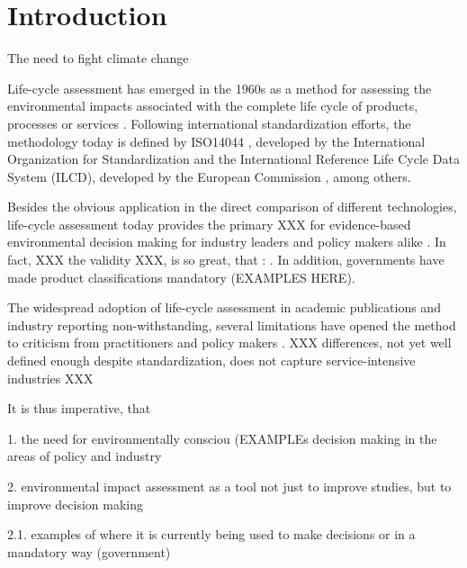 \documentclass{article}
\begin{document}
\section{Introduction}

    The need to fight climate change \cite{rama_climate_2022}

    Life-cycle assessment has emerged in the 1960s as a method for assessing the environmental impacts associated with the complete life cycle of products, processes or services \cite{hauschild_life_2018}. Following international standardization efforts, the methodology today is defined by ISO14044 \cite{noauthor_iso_2006}, developed by the International Organization for Standardization and the International Reference Life Cycle Data System (ILCD), developed by the European Commission \cite{european_commission_joint_research_centre_institute_for_environment_and_sustainability_ildc_2010}, among others. 
    
    Besides the obvious application in the direct comparison of different technologies, life-cycle assessment today provides the primary XXX for evidence-based environmental decision making for industry leaders and policy makers alike \cite{seidel_application_2016}. In fact, XXX the validity XXX, is so great, that : \cite{tillman_significance_2000}\cite{dong_environmental_2018}. In addition, governments have made product classifications mandatory (EXAMPLES HERE). 
    
    The widespread adoption of life-cycle assessment in academic publications and industry reporting non-withstanding, several limitations have opened the method to criticism from practitioners and policy makers \cite{finnveden_limitations_2000}\cite{plevin_using_2014}. XXX differences, not yet well defined enough despite standardization, does not capture service-intensive industries XXX
    
    
    It is thus imperative, that \cite{jasanoff_contested_1987}
    
    

    1. the need for environmentally consciou (EXAMPLEs decision making in the areas of policy and industry
    
    2. environmental impact assessment as a tool not just to improve studies, but to improve decision making
    
        2.1. examples of where it is currently being used to make decisions or in a mandatory way (government)
    
    
    
\end{document}
